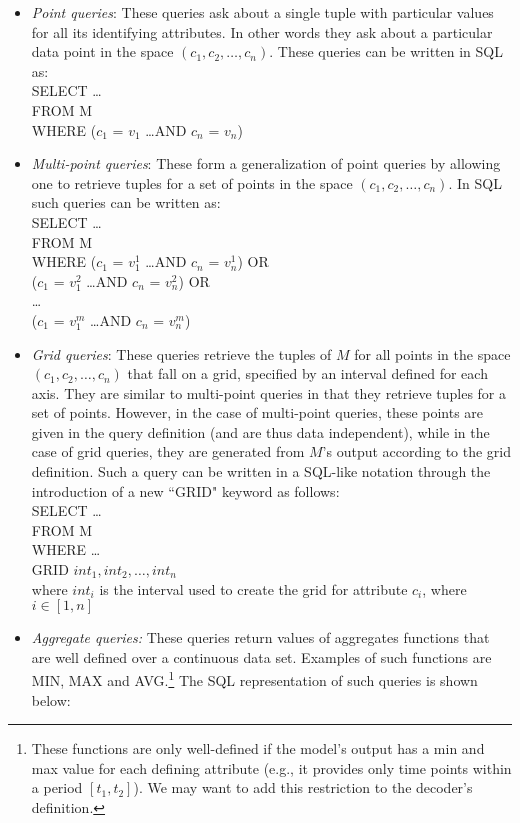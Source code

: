 \documentclass{sig-alternate}
\begin{document}
\begin{itemize}
\item \emph{Point queries}: These queries ask about a single tuple with particular values for all its identifying attributes. In other words they ask about a particular data point in the space $(c_1, c_2, \ldots, c_n)$. These queries can be written in SQL as:\\
 
SELECT \ldots\\
FROM M\\
WHERE ($c_1$ = $v_1$ \ldots AND $c_n$ = $v_n$)
%
\item \emph{Multi-point queries}: These form a generalization of point queries by allowing one to retrieve tuples for a set of points in the space $(c_1, c_2, \ldots, c_n)$. In SQL such queries can be written as:\\

SELECT \ldots\\
FROM M\\
WHERE ($c_1$ = $v_1^1$ \ldots AND $c_n$ = $v_n^1$) OR\\
\hspace*{1.4cm}($c_1$ = $v_1^2$ \ldots AND $c_n$ = $v_n^2$) OR\\
\hspace*{1.4cm}\ldots\\
\hspace*{1.4cm}($c_1$ = $v_1^m$ \ldots AND $c_n$ = $v_n^m$)\\
%
\item \emph{Grid queries}: These queries retrieve the tuples of $M$ for all points in the space $(c_1, c_2, \ldots, c_n)$ that fall on a grid, specified by an interval defined for each axis. They are similar to multi-point queries in that they retrieve tuples for a set of points. However, in the case of multi-point queries, these points are given in the query definition (and are thus data independent), while in the case of grid queries, they are generated from $M$'s output according to the grid definition. Such a query can be written in a SQL-like notation through the introduction of a new ``GRID" keyword as follows:\\

SELECT \ldots\\
FROM M\\
WHERE \ldots\\
GRID $int_1, int_2, \ldots, int_n$\\

where $int_i$ is the interval used to create the grid for attribute $c_i$, where $i \in [1, n]$ 
%
\item \emph{Aggregate queries:} These queries return values of aggregates functions that are well defined over a continuous data set. Examples of such functions are MIN, MAX and AVG.\footnote{These functions are only well-defined if the model's output has a min and max value for each defining attribute (e.g., it provides only time points within a period $[t_1, t_2]$). We may want to add this restriction to the decoder's definition.} The SQL representation of such queries is shown below:\\


\end{itemize}
\end{document}
